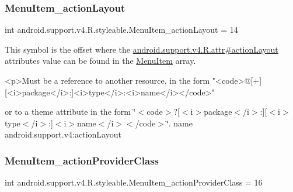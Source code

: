 \mbox{\label{classandroid_1_1support_1_1v4_1_1R_1_1styleable_af194808a4ba1c7a693afbd147948aeb5}} 
\subsubsection{\texorpdfstring{Menu\+Item\+\_\+action\+Layout}{MenuItem\_actionLayout}}
{\footnotesize\ttfamily int android.\+support.\+v4.\+R.\+styleable.\+Menu\+Item\+\_\+action\+Layout = 14\hspace{0.3cm}{\ttfamily [static]}}

This symbol is the offset where the \hyperlink{classandroid_1_1support_1_1v4_1_1R_1_1attr_aaa9aa593650ce0ecbacb2754922c8a77}{android.\+support.\+v4.\+R.\+attr\#action\+Layout} attribute\textquotesingle{}s value can be found in the \hyperlink{classandroid_1_1support_1_1v4_1_1R_1_1styleable_a4234e016636b99c0c3d9cfc512903697}{Menu\+Item} array.

\begin{DoxyVerb}      <p>Must be a reference to another resource, in the form "<code>@[+][<i>package</i>:]<i>type</i>:<i>name</i></code>"
\end{DoxyVerb}
 or to a theme attribute in the form \char`\"{}$<$code$>$?\mbox{[}$<$i$>$package$<$/i$>$\+:\mbox{]}\mbox{[}$<$i$>$type$<$/i$>$\+:\mbox{]}$<$i$>$name$<$/i$>$$<$/code$>$\char`\"{}.  name android.\+support.\+v4\+:action\+Layout \mbox{\label{classandroid_1_1support_1_1v4_1_1R_1_1styleable_ae90ac3b2f2bea80a71d360cb82e35219}} 
\subsubsection{\texorpdfstring{Menu\+Item\+\_\+action\+Provider\+Class}{MenuItem\_actionProviderClass}}
{\footnotesize\ttfamily int android.\+support.\+v4.\+R.\+styleable.\+Menu\+Item\+\_\+action\+Provider\+Class = 16\hspace{0.3cm}{\ttfamily [static]}}

